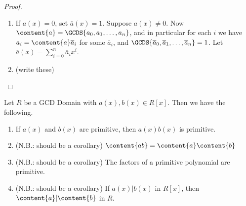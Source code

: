 \documentclass{article}
\begin{document}
\begin{proof} \mbox{}
\begin{enumerate}
\item If $a(x) = 0$, set $\overline{a}(x) = 1$. Suppose $a(x) \neq 0$. Now $\content{a} = \GCDS{a_0,a_1,\ldots,a_n}$, and in particular for each $i$ we have $a_i = \content{a}\overline{a}_i$ for some $\overline{a}_i$, and $\GCDS{\overline{a}_0, \overline{a}_1, \ldots, \overline{a}_n} = 1$. Let $\overline{a}(x) = \sum_{i=0}^n \overline{a}_i x^i$.

\item (write these)
\end{enumerate}
\end{proof}

\begin{prop}
Let $R$ be a GCD Domain with $a(x), b(x) \in R[x]$. Then we have the following.
\begin{enumerate}
\item If $a(x)$ and $b(x)$ are primitive, then $a(x)b(x)$ is primitive.
\item (N.B.: should be a corollary) $\content{ab} = \content{a}\content{b}$
\item (N.B.: should be a corollary) The factors of a primitive polynomial are primitive.
\item (N.B.: should be a corollary) If $a(x)|b(x)$ in $R[x]$, then $\content{a}|\content{b}$ in $R$.
\end{enumerate}
\end{prop}
\end{document}
